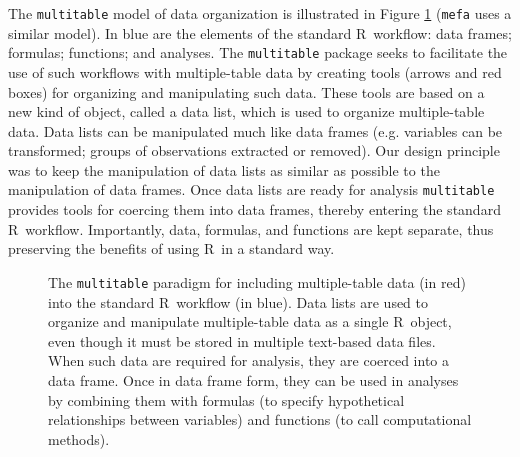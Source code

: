 \documentclass{article}
\newcommand{\R}{{\sf R}}
\newcommand{\code}[1]{\texttt{#1}}
\numberwithin{exercise}{section}
\begin{document}
The \code{multitable} model of data organization is illustrated in Figure \ref{fig:model} (\code{mefa} uses a similar model).  In blue are the elements of the standard \R\ workflow: data frames; formulas; functions; and analyses.  The \code{multitable} package seeks to facilitate the use of such workflows with multiple-table data by creating tools (arrows and red boxes) for organizing and manipulating such data.  These tools are based on a new kind of object, called a data list, which is used to organize multiple-table data.  Data lists can be manipulated much like data frames (e.g. variables can be transformed; groups of observations extracted or removed).  Our design principle was to keep the manipulation of data lists as similar as possible to the manipulation of data frames.  Once data lists are ready for analysis \code{multitable} provides tools for coercing them into data frames, thereby entering the standard \R\ workflow.  Importantly, data, formulas, and functions are kept separate, thus preserving the benefits of using \R\ in a standard way.

\begin{figure}
\caption{The \code{multitable} paradigm for including multiple-table data (in red) into the standard \R\ workflow (in blue).  Data lists are used to organize and manipulate multiple-table data as a single \R\ object, even though it must be stored in multiple text-based data files.  When such data are required for analysis, they are coerced into a data frame.  Once in data frame form, they can be used in analyses by combining them with formulas (to specify hypothetical relationships between variables) and functions (to call computational methods).} 
\label{fig:model}
\end{figure}
\end{document}
